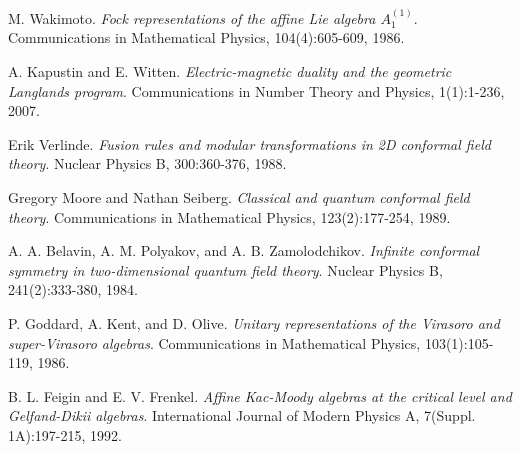 \begin{thebibliography}{99}
M. Wakimoto.
\textit{Fock representations of the affine Lie algebra $A_1^{(1)}$}.
Communications in Mathematical Physics, 104(4):605-609, 1986.

A. Kapustin and E. Witten.
\textit{Electric-magnetic duality and the geometric Langlands program}.
Communications in Number Theory and Physics, 1(1):1-236, 2007.

Erik Verlinde.
\textit{Fusion rules and modular transformations in 2D conformal field theory}.
Nuclear Physics B, 300:360-376, 1988.

Gregory Moore and Nathan Seiberg.
\textit{Classical and quantum conformal field theory}.
Communications in Mathematical Physics, 123(2):177-254, 1989.

A. A. Belavin, A. M. Polyakov, and A. B. Zamolodchikov.
\textit{Infinite conformal symmetry in two-dimensional quantum field theory}.
Nuclear Physics B, 241(2):333-380, 1984.

P. Goddard, A. Kent, and D. Olive.
\textit{Unitary representations of the Virasoro and super-Virasoro algebras}.
Communications in Mathematical Physics, 103(1):105-119, 1986.

B. L. Feigin and E. V. Frenkel.
\textit{Affine Kac-Moody algebras at the critical level and Gelfand-Dikii algebras}.
International Journal of Modern Physics A, 7(Suppl. 1A):197-215, 1992.
 
\end{thebibliography}